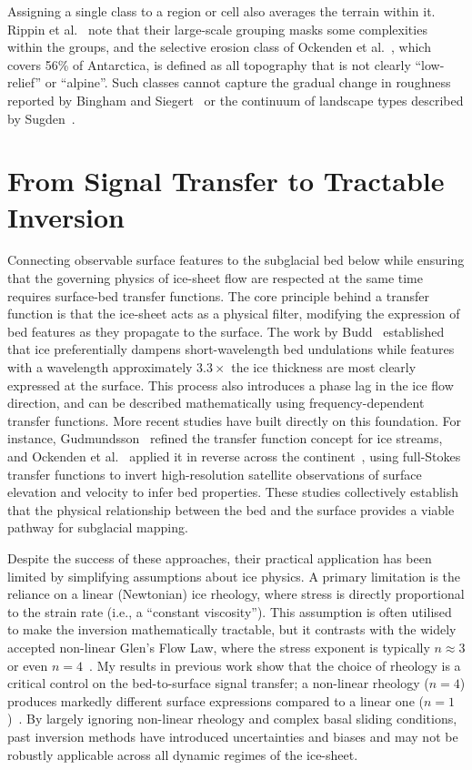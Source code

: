 Assigning a single class to a region or cell also averages the terrain within it. Rippin et al.~\cite{Rippin_2014} note that their large-scale grouping masks some complexities within the groups, and the selective erosion class of Ockenden et al.~\cite{Ockenden_2026}, which covers 56\% of Antarctica, is defined as all topography that is not clearly ``low-relief'' or ``alpine''. Such classes cannot capture the gradual change in roughness reported by Bingham and Siegert~\cite{Bingham_2007} or the continuum of landscape types described by Sugden~\cite{Sugden_1978}.

\section{From Signal Transfer to Tractable Inversion}\label{theoretical_frameworks}

Connecting observable surface features to the subglacial bed below while ensuring that the governing physics of ice-sheet flow are respected at the same time requires surface-bed transfer functions. The core principle behind a transfer function is that the ice-sheet acts as a physical filter, modifying the expression of bed features as they propagate to the surface. The work by Budd~\cite{Budd_1970} established that ice preferentially dampens short-wavelength bed undulations while features with a wavelength approximately $3.3\times$ the ice thickness are most clearly expressed at the surface. This process also introduces a phase lag in the ice flow direction, and can be described mathematically using frequency-dependent transfer functions. More recent studies have built directly on this foundation. For instance, Gudmundsson~\cite{Gudmundsson_2003} refined the transfer function concept for ice streams, and Ockenden et al.~\cite{Ockenden_2023} applied it in reverse across the continent~\cite{Ockenden_2026}, using full-Stokes transfer functions to invert high-resolution satellite observations of surface elevation and velocity to infer bed properties. These studies collectively establish that the physical relationship between the bed and the surface provides a viable pathway for subglacial mapping.

Despite the success of these approaches, their practical application has been limited by simplifying assumptions about ice physics. A primary limitation is the reliance on a linear (Newtonian) ice rheology, where stress is directly proportional to the strain rate (i.e., a ``constant viscosity''). This assumption is often utilised to make the inversion mathematically tractable, but it contrasts with the widely accepted non-linear Glen's Flow Law, where the stress exponent is typically $n \approx 3$ or even $n = 4$~\cite{Getraer_2025}. My results in previous work show that the choice of rheology is a critical control on the bed-to-surface signal transfer; a non-linear rheology ($n = 4$) produces markedly different surface expressions compared to a linear one ($n = 1$)~\cite{Fabela_Hinojosa_2025}. By largely ignoring non-linear rheology and complex basal sliding conditions, past inversion methods have introduced uncertainties and biases and may not be robustly applicable across all dynamic regimes of the ice-sheet.

